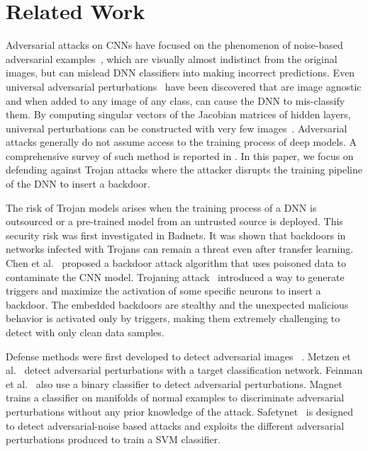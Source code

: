 \documentclass{article}
\begin{document}
\vspace{-4mm}
\section{Related Work} \vspace{-4mm}

Adversarial attacks on CNNs have focused on the phenomenon of noise-based adversarial examples~\cite{szegedy2013intriguing,akhtar2018defense}, which are visually almost indistinct from the original images, but can mislead DNN classifiers into making incorrect predictions. Even universal adversarial perturbations~\cite{moosavi2017universal} have been discovered that are image agnostic and when added to any image of any class, can cause the DNN to mis-classify them. By computing singular vectors of the Jacobian matrices of hidden layers, universal perturbations can be constructed with very few images~\cite{Khrulkov_2018_CVPR}. Adversarial attacks generally do not assume access to the training process of deep models. A comprehensive survey of such method is reported in \cite{akhtar2018threat}. In this paper, we focus on defending against Trojan attacks where the attacker disrupts the training pipeline of the DNN to insert a backdoor. 






The risk of Trojan models arises when the training process of a DNN is outsourced or a pre-trained model from an untrusted source is deployed. This security risk was first investigated in Badnets\cite{gu2017badnets}. It was shown that backdoors in networks infected with Trojans can remain a threat even after transfer learning. Chen et al.~\cite{chen2017targeted} proposed a backdoor attack algorithm that uses poisoned data to contaminate the CNN model. Trojaning attack~\cite{liu2017trojaning} introduced a way to generate triggers and maximize the activation of some specific neurons to insert a backdoor. The embedded backdoors are stealthy and the unexpected malicious behavior is activated only by triggers, making them extremely challenging to detect with only clean data samples. 

Defense methods were first developed to detect adversarial images ~\cite{Akhtar_2018_CVPR,xie2019feature,yuan2019adversarial,Liao_2018_CVPR,grosse2017statistical,hendrycks2016early}. Metzen et al.~\cite{metzen2017detecting} detect  adversarial perturbations with a target classification network. Feinman et al.~\cite{feinman2017detecting} also use a binary classifier to detect adversarial perturbations. Magnet~\cite{meng2017magnet} trains a classifier on manifolds of normal examples to discriminate adversarial perturbations without any prior knowledge of the attack. Safetynet~\cite{lusafetynet} is designed to detect adversarial-noise based attacks and exploits the different adversarial perturbations produced to train a SVM classifier.
\end{document}
